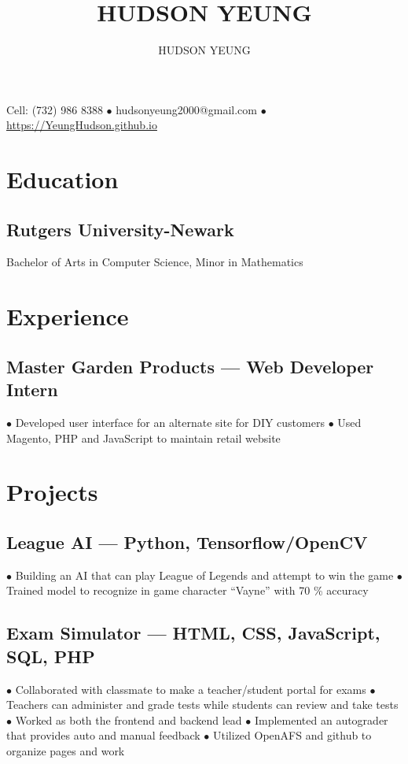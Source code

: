 \documentclass{article}
\makeatletter
\newcommand\bulletpts{$\bullet$}
\newcommand\bulletspace{\hspace*{.5em}}
\renewcommand{\maketitle}{
\begin{center}
{\huge\bfseries
\theauthor}

\vspace{.15em}

Cell: (732) 986 8388 $\bullet$ hudsonyeung2000@gmail.com $\bullet$ \url{https://YeungHudson.github.io}
\end{center}
}
\makeatother
\begin{document}
\title{HUDSON YEUNG}
\author{HUDSON YEUNG}
\maketitle

\section{Education}
\subsection{Rutgers University-Newark}
Bachelor of Arts in Computer Science, Minor in Mathematics \hfill{}\par

\section{Experience}
\subsection{Master Garden Products --- Web Developer Intern \hfill{}}
\bulletspace{}\bulletpts{} Developed user interface for an alternate site for DIY customers \newline
\bulletspace{}\bulletpts{} Used Magento, PHP and JavaScript to maintain retail website

\section{Projects}
\subsection{League AI --- Python, Tensorflow/OpenCV \hfill{}}
\bulletspace{}\bulletpts{} Building an AI that can play League of Legends and attempt to win the game \newline
\bulletspace{}\bulletpts{} Trained model to recognize in game character ``Vayne'' with 70 \% accuracy
\subsection{Exam Simulator --- HTML, CSS, JavaScript, SQL, PHP \hfill{}}
\bulletspace\bulletpts{} Collaborated with classmate to make a teacher/student portal for exams \newline 
\bulletspace\bulletpts{} Teachers can administer and grade tests while students can review and take tests \newline
\bulletspace\bulletpts{} Worked as both the frontend and backend lead \newline
\bulletspace\bulletpts{} Implemented an autograder that provides auto and manual feedback \newline
\bulletspace\bulletpts{} Utilized OpenAFS and github to organize pages and work
\end{document}
